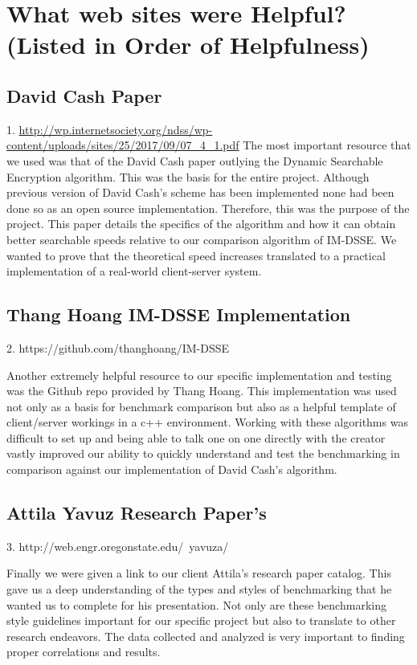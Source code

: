 \clearpage

\section{ What web sites were Helpful? (Listed in Order of Helpfulness)}

\subsection{David Cash Paper}
1. \url{http://wp.internetsociety.org/ndss/wp-content/uploads/sites/25/2017/09/07_4_1.pdf}
The most important resource that we used was that of the David Cash paper outlying the Dynamic Searchable Encryption algorithm. This was the basis for the entire project. Although previous version of David Cash’s scheme has been implemented none had been done so as an open source implementation. Therefore, this was the purpose of the project. This paper details the specifics of the algorithm and how it can obtain better searchable speeds relative to our comparison algorithm of IM-DSSE. We wanted to prove that the theoretical speed increases translated to a practical implementation of a real-world client-server system.

\subsection{Thang Hoang IM-DSSE Implementation}
2. https://github.com/thanghoang/IM-DSSE

Another extremely helpful resource to our specific implementation and testing was the Github repo provided by Thang Hoang. This implementation was used not only as a basis for benchmark comparison but also as a helpful template of client/server workings in a c++ environment. Working with these algorithms was difficult to set up and being able to talk one on one directly with the creator vastly improved our ability to quickly understand and test the benchmarking in comparison against our implementation of David Cash’s algorithm.

\subsection{Attila Yavuz Research Paper's}
3. http://web.engr.oregonstate.edu/~yavuza/

Finally we were given a link to our client Attila’s research paper catalog. This gave us a deep understanding of the types and styles of benchmarking that he wanted us to complete for his presentation. Not only are these benchmarking style guidelines important for our specific project but also to translate to other research endeavors. The data collected and analyzed is very important to finding proper correlations and results.


